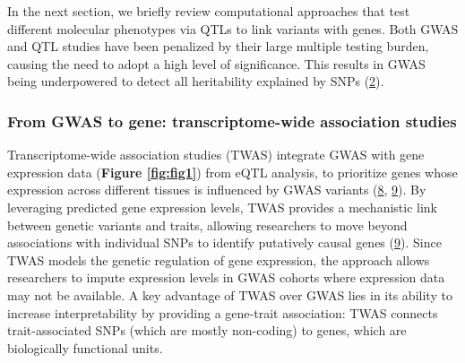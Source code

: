 In the next section, we briefly review computational approaches that test different molecular phenotypes via QTLs to link variants with genes.
Both GWAS and QTL studies have been penalized by their large multiple testing burden, causing the need to adopt a high level of significance.
This results in GWAS being underpowered to detect all heritability explained by SNPs (\protect\hyperlink{ref-17B4AigZT}{2}).

\hypertarget{from-gwas-to-gene-transcriptome-wide-association-studies}{%
\subsubsection{From GWAS to gene: transcriptome-wide association studies}\label{from-gwas-to-gene-transcriptome-wide-association-studies}}

Transcriptome-wide association studies (TWAS) integrate GWAS with gene expression data (\textbf{Figure \ref{fig:fig1}}) from eQTL analysis, to prioritize genes whose expression across different tissues is influenced by GWAS variants (\protect\hyperlink{ref-ReOPt75u}{8}, \protect\hyperlink{ref-l6ogswV3}{9}).
By leveraging predicted gene expression levels, TWAS provides a mechanistic link between genetic variants and traits, allowing researchers to move beyond associations with individual SNPs to identify putatively causal genes (\protect\hyperlink{ref-l6ogswV3}{9}).
Since TWAS models the genetic regulation of gene expression, the approach allows researchers to impute expression levels in GWAS cohorts where expression data may not be available.
A key advantage of TWAS over GWAS lies in its ability to increase interpretability by providing a gene-trait association: TWAS connects trait-associated SNPs (which are mostly non-coding) to genes, which are biologically functional units.

